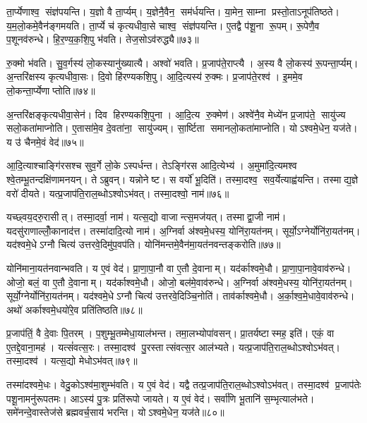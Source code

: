 ता॒र्प्येणाश्व॒ संज्ञ॑पयन्ति। य॒ज्ञो वै ता॒र्प्यम्। य॒ज्ञेनै॒वैन॒ सम॑र्धयन्ति। या॒मेन॒ साम्ना प्रस्तो॒ताऽनूप॑तिष्ठते। य॒म॒लो॒कमे॒वैन॑ङ्गमयति। ता॒र्प्ये च॑ कृत्यधीवा॒से चाश्व॒ संज्ञ॑पयन्ति। ए॒तद्वै प॑शू॒ना रू॒पम्। रू॒पेणै॒व प॒शूनव॑रुन्धे। हि॒र॒ण्य॒क॒शि॒पु भ॑वति। तेज॒सोऽव॑रुद्ध्यै॥७३॥

रु॒क्मो भ॑वति। सु॒व॒र्गस्य॑ लो॒कस्यानु॑ख्यात्यै। अश्वो॑ भवति। प्र॒जाप॑ते॒राप्त्यै। अ॒स्य वै लो॒कस्य॑ रू॒पन्ता॒र्प्यम्। अ॒न्तरि॑क्षस्य कृत्यधीवा॒सः। दि॒वो हि॑रण्यकशि॒पु। आ॒दि॒त्यस्य॑ रु॒क्मः। प्र॒जाप॑ते॒रश्व॑। इ॒ममे॒व लो॒कन्ता॒र्प्येणाप्तोति॥७४॥

अ॒न्तरि॑क्षङ्कृत्यधीवा॒सेन॑। दिव हिरण्यकशि॒पुना। आ॒दि॒त्य रु॒क्मेण॑। अश्वे॑नै॒व मेध्ये॑न प्र॒जाप॑ते॒ सायु॑ज्य सलो॒कता॑माप्नोति। ए॒तासा॑मे॒व दे॒वता॑ना॒ सायु॑ज्यम्। सा॒र्ष्टिता समानलो॒कता॑माप्नोति। योऽश्वमे॒धेन॒ यज॑ते। य उ॑ चैनमे॒वं वेद॑॥७५॥\anuvakamend[अव॑रुध्या आप्नोत्य॒ष्टौ च॑]

आ॒दि॒त्याश्चाङ्गि॑रसश्च सुव॒र्गे लो॒केऽस्पर्धन्त। तेऽङ्गि॑रस आदि॒त्येभ्य॑। अ॒मुमा॑दि॒त्यमश्व श्वे॒तम्भू॒तन्दक्षि॑णामनयन्। तेऽब्रुवन्। यन्नोनेष्ट। स वर्यो॑ भू॒दिति॑। तस्मा॒दश्व॒ सव॒र्येत्याह्व॑यन्ति। तस्माद्य॒ज्ञे वरो॑ दीयते। यत्प्र॒जाप॑ति॒राल॒ब्धोऽश्वोऽभ॑वत्। तस्मा॒दश्वो॒ नाम॑॥७६॥

यच्छ्वय॒दरु॒रासीत्। तस्मा॒दर्वा॒ नाम॑। यत्स॒द्यो वाजान्त्स॒मज॑यत्। तस्माद्वा॒जी नाम॑। यदसु॑राणाल्लोँ॒कानाद॑त्त। तस्मा॑दादि॒त्यो नाम॑। अ॒ग्निर्वा अ॑श्वमे॒धस्य॒ योनि॑रा॒यत॑नम्। सूर्यो॒ऽग्नेर्योनि॑रा॒यत॑नम्। यद॑श्वमे॒धेऽग्नौ चित्य॑ उत्तरवे॒दिमु॑प॒वप॑ति। योनि॑मन्तमे॒वैन॑मा॒यत॑नवन्तङ्करोति॥७७॥

योनि॑माना॒यत॑नवान्भवति। य ए॒वं वेद॑। प्रा॒णा॒पा॒नौ वा ए॒तौ दे॒वानाम्। यद॑र्काश्वमे॒धौ। प्रा॒णा॒पा॒नावे॒वाव॑रुन्धे। ओजो॒ बलं॒ वा ए॒तौ दे॒वानाम्। यद॑र्काश्वमे॒धौ। ओजो॒ बल॑मे॒वाव॑रुन्धे। अ॒ग्निर्वा अ॑श्वमे॒धस्य॒ योनि॑रा॒यत॑नम्। सूर्यो॒ग्नेर्योनि॑रा॒यत॑नम्। यद॑श्वमे॒धेऽग्नौ चित्य॑ उत्तरवे॒दिञ्चि॒नोति॑। ताव॑र्काश्वमे॒धौ। अ॒र्का॒श्व॒मे॒धावे॒वाव॑रुन्धे। अथो॑ अर्काश्वमे॒धयो॑रे॒व प्रति॑तिष्ठति॥७८॥\anuvakamend[नाम॑ करोति॒ सूर्यो॒ऽग्नेर्योनि॑रा॒यत॑नञ्च॒त्वारि॑ च]

प्र॒जाप॑तिं॒ वै दे॒वाः पि॒तरम्। प॒शुम्भू॒तम्मेधा॒याल॑भन्त। तमा॒लभ्योपा॑वसन्। प्रा॒तर्यष्टास्मह॒ इति॑। एकं॒ वा ए॒तद्दे॒वाना॒मह॑। यत्सं॑वत्स॒रः। तस्मा॒दश्व॑ पु॒रस्तात्संवत्स॒र आल॑भ्यते। यत्प्र॒जाप॑ति॒राल॒ब्धोऽश्वोऽभ॑वत्। तस्मा॒दश्व॑। यत्स॒द्यो मेधोऽभ॑वत्॥७९॥

तस्मा॑दश्वमे॒धः। वेदु॒कोऽश्व॑मा॒शुम्भ॑वति। य ए॒वं वेद॑। यद्वै तत्प्र॒जाप॑ति॒राल॒ब्धोऽश्वोऽभ॑वत्। तस्मा॒दश्व॑ प्र॒जाप॑तेः पशू॒नामनु॑रूपतमः। आऽस्य॑ पु॒त्रः प्रति॑रूपो जायते। य ए॒वं वेद॑। सर्वा॑णि भू॒तानि॑ स॒म्भृत्याल॑भते। समे॑नन्दे॒वास्तेज॑से ब्रह्मवर्च॒साय॑ भरन्ति। योऽश्वमे॒धेन॒ यज॑ते॥८०॥

